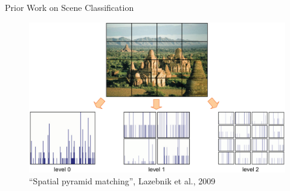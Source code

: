 \documentclass[mathserif]{beamer}
\begin{document}
\begin{frame}{Prior Work on Scene Classification}
    \begin{figure}
        \includegraphics[width=.9\textwidth]{illustrations/related_work/pyramid_lazebnik09}
        \caption{``Spatial pyramid matching'', Lazebnik et al., 2009}
    \end{figure}
\end{frame}
\end{document}
